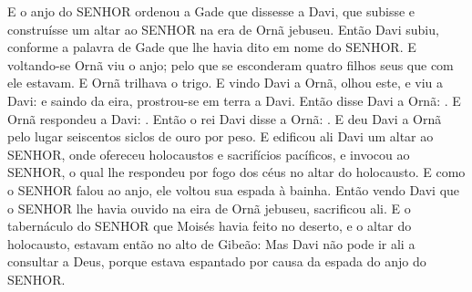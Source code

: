 {  E o anjo do SENHOR ordenou a Gade que dissesse a Davi, que subisse e construísse um altar ao SENHOR na era de Ornã jebuseu.
  Então Davi subiu, conforme a palavra de Gade que lhe havia dito em nome do SENHOR.
  E voltando-se Ornã viu o anjo; pelo que se esconderam quatro filhos seus que com ele estavam. E Ornã trilhava o trigo.
  E vindo Davi a Ornã, olhou este, e viu a Davi: e saindo da eira, prostrou-se em terra a Davi.
  Então disse Davi a Ornã: .
  E Ornã respondeu a Davi: .
  Então o rei Davi disse a Ornã: .
  E deu Davi a Ornã pelo lugar seiscentos siclos de ouro por peso.
  E edificou ali Davi um altar ao SENHOR, onde ofereceu holocaustos e sacrifícios pacíficos, e invocou ao SENHOR, o qual lhe respondeu por fogo dos céus no altar do holocausto. %
  E como o SENHOR falou ao anjo, ele voltou sua espada à bainha.
  Então vendo Davi que o SENHOR lhe havia ouvido na eira de Ornã jebuseu, sacrificou ali.
  E o tabernáculo do SENHOR que Moisés havia feito no deserto, e o altar do holocausto, estavam então no alto de Gibeão:
  Mas Davi não pode ir ali a consultar a Deus, porque estava espantado por causa da espada do anjo do SENHOR.
\par }

